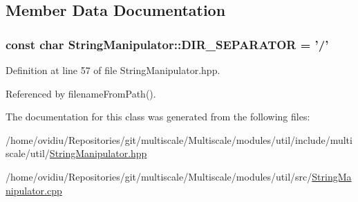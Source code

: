 \subsection{Member Data Documentation}
\hypertarget{classmultiscale_1_1StringManipulator_a3c975968005d8db010415d240b02b5db}{
\subsubsection[{D\-I\-R\-\_\-\-S\-E\-P\-A\-R\-A\-T\-O\-R}]{\setlength{\rightskip}{0pt plus 5cm}const char String\-Manipulator\-::\-D\-I\-R\-\_\-\-S\-E\-P\-A\-R\-A\-T\-O\-R = '/'\hspace{0.3cm}{\ttfamily [static]}}}\label{classmultiscale_1_1StringManipulator_a3c975968005d8db010415d240b02b5db}


Definition at line 57 of file String\-Manipulator.\-hpp.



Referenced by filename\-From\-Path().



The documentation for this class was generated from the following files\-:\begin{DoxyCompactItemize}
\item 
/home/ovidiu/\-Repositories/git/multiscale/\-Multiscale/modules/util/include/multiscale/util/\hyperlink{StringManipulator_8hpp}{String\-Manipulator.\-hpp}\item 
/home/ovidiu/\-Repositories/git/multiscale/\-Multiscale/modules/util/src/\hyperlink{StringManipulator_8cpp}{String\-Manipulator.\-cpp}\end{DoxyCompactItemize}
